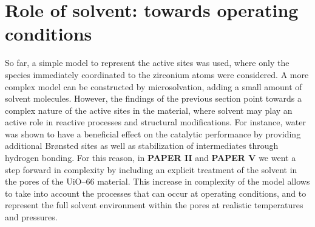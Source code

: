 \section{Role of solvent: towards operating conditions}
So far, a simple model to represent the active sites was used, where only the species immediately coordinated to the zirconium atoms were considered. A more complex model can be constructed by microsolvation, adding a small amount of solvent molecules. However, the findings of the previous section point towards a complex nature of the active sites in the material, where solvent may play an active role in reactive processes and structural modifications. 
For instance, water was shown to have a beneficial effect on the catalytic performance by providing additional Br\o{}nsted sites as well as stabilization of intermediates through hydrogen bonding. For this reason, in \textbf{PAPER II} and \textbf{PAPER V} we went a step forward in complexity by including an explicit treatment of the solvent in the pores of the UiO--66 material. This increase in complexity of the model allows to take into account the processes that can occur at operating conditions, and to represent the full solvent environment within the pores at realistic temperatures and pressures.

